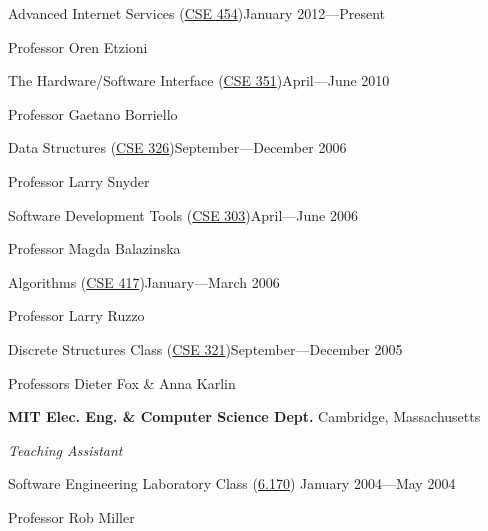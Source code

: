 \documentclass[letter]{article}
\begin{document}
\vspace{0.5\baselineskip}
\par
Advanced Internet Services (\href{http://www.cs.washington.edu/education/courses/454/12wi/}{CSE 454})\hfill January 2012---Present
\par
Professor Oren Etzioni

\vspace{0.5\baselineskip}
\par
The Hardware/Software Interface (\href{http://www.cs.washington.edu/education/courses/351/10sp/}{CSE 351})\hfill April---June 2010
\par
Professor Gaetano Borriello

\vspace{0.5\baselineskip}
\par
Data Structures (\href{http://www.cs.washington.edu/education/courses/326/06au/}{CSE 326})\hfill September---December 2006
\par
Professor Larry Snyder

\vspace{0.5\baselineskip}
\par
Software Development Tools (\href{http://www.cs.washington.edu/education/courses/303/06sp/}{CSE 303})\hfill April---June 2006
\par
Professor Magda Balazinska

\vspace{0.5\baselineskip}
\par
Algorithms (\href{http://www.cs.washington.edu/education/courses/417/06wi/}{CSE 417})\hfill January---March 2006
\par
Professor Larry Ruzzo

\vspace{0.5\baselineskip}
\par
Discrete Structures Class (\href{http://www.cs.washington.edu/education/courses/321/05au/}{CSE 321})\hfill September---December 2005
\par
Professors Dieter Fox \& Anna Karlin
\par

\vspace{\baselineskip}
\par
{\bf MIT Elec. Eng. \& Computer Science Dept.} \hfill Cambridge, Massachusetts

\vspace{0.5\baselineskip}
\par
{\em Teaching Assistant}
\par
Software Engineering Laboratory Class (\href{http://courses.csail.mit.edu/6.170/old-www/2004-Spring/admin-info/generalinfo.html#Staff}{6.170}) \hfill January 2004---May 2004
\par
Professor Rob Miller
\end{document}
